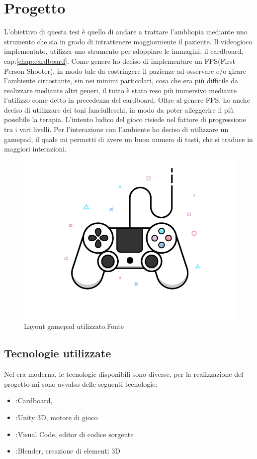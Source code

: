 \documentclass[10pt,a4paper]{article}
\begin{document}
    \section{Progetto}
    L'obiettivo di questa tesi è quello di andare a trattare l'ambliopia mediante uno strumento che sia in grado di intrattenere maggiormente il paziente.  
    Il videogioco implementato, utilizza uno strumento per sdoppiare le immagini, il cardboard, cap:\ref{chap:cardboard}.
    Come genere ho deciso di implementare un FPS(First Person Shooter), in modo tale da costringere il pazienze ad osservare e/o girare l'ambiente circostante, sin nei minimi particolari, cosa che era più difficile da realizzare mediante altri generi, il tutto è stato reso più immersivo mediante l'utilizzo come detto in precedenza del cardboard.
    Oltre al genere FPS, ho anche deciso di utilizzare dei toni fanciulleschi, in modo da poter alleggerire il più possibile la terapia.
    L'intento ludico del gioco risiede nel fattore di progressione tra i vari livelli.
    Per l'interazione con l'ambiente ho deciso di utilizzare un gamepad, il quale mi permetti di avere un buon numero di tasti, che si traduce in maggiori interazioni.
     \begin{figure}[H]
    	\centering
    	\includegraphics[width=0.8\linewidth]{image/gamepad}
    	\caption{Layout gamepad utilizzato.Fonte\cite{controller_image}}
    	\label{fig:gamepad}
    \end{figure}
  
    \subsection{Tecnologie utilizzate}
    Nel era moderna, le tecnologie disponibili sono diverse, per la realizzazione del progetto mi sono avvalso delle seguenti tecnologie:
    \begin{itemize}
    	\item:Cardboard, 
    	\item:Unity 3D, motore di gioco
    	\item:Visual Code, editor di codice sorgente
    	\item:Blender, creazione di elementi 3D
    \end{itemize}
\end{document}
